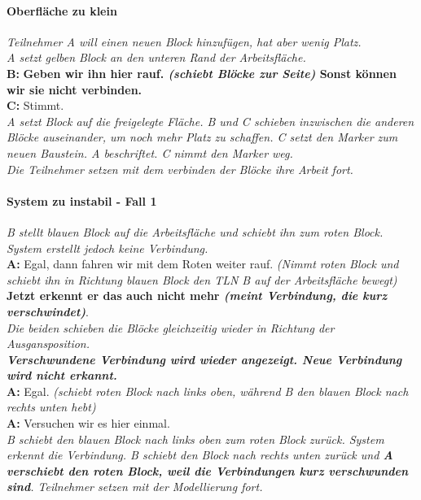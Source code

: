 \paragraph{Oberfläche zu klein} 

\begin{transkript}
\emph{Teilnehmer A will einen neuen Block hinzufügen, hat aber wenig Platz.} \\
\emph{A setzt gelben Block an den unteren Rand der Arbeitsfläche.} \\
\textbf{B:} \textbf{Geben wir ihn hier rauf. \emph{(schiebt Blöcke zur Seite)} Sonst können wir sie nicht verbinden.} \\
\textbf{C:} Stimmt. \\
\emph{A setzt Block auf die freigelegte Fläche. B und C schieben inzwischen die anderen Blöcke auseinander, um noch mehr Platz zu schaffen. C setzt den Marker zum neuen Baustein. A beschriftet. C nimmt den Marker weg.} \\
\emph{Die Teilnehmer setzen mit dem verbinden der Blöcke ihre Arbeit fort.} \\
\end{transkript}

\paragraph{System zu instabil - Fall 1}

\begin{transkript}
\emph{B stellt blauen Block auf die Arbeitsfläche und schiebt ihn zum roten Block. System erstellt jedoch keine Verbindung.} \\
\textbf{A:} Egal, dann fahren wir mit dem Roten weiter rauf. \emph{(Nimmt roten Block und schiebt ihn in Richtung blauen Block den TLN B auf der Arbeitsfläche bewegt)} \textbf{Jetzt erkennt er das auch nicht mehr \emph{(meint Verbindung, die kurz verschwindet)}}. \\
\emph{Die beiden schieben die Blöcke gleichzeitig wieder in Richtung der Ausgansposition.} \\ \emph{\textbf{Verschwundene Verbindung wird wieder angezeigt. Neue Verbindung wird nicht erkannt.}} \\
\textbf{A:} Egal. \emph{(schiebt roten Block nach links oben, während B den blauen Block nach rechts unten hebt)} \\
\textbf{A:} Versuchen wir es hier einmal. \\
\emph{B schiebt den blauen Block nach links oben zum roten Block zurück. System erkennt die Verbindung. B schiebt den Block nach rechts unten zurück und \textbf{A verschiebt den roten Block, weil die Verbindungen kurz verschwunden sind}. Teilnehmer setzen mit der Modellierung fort.}
\end{transkript}

